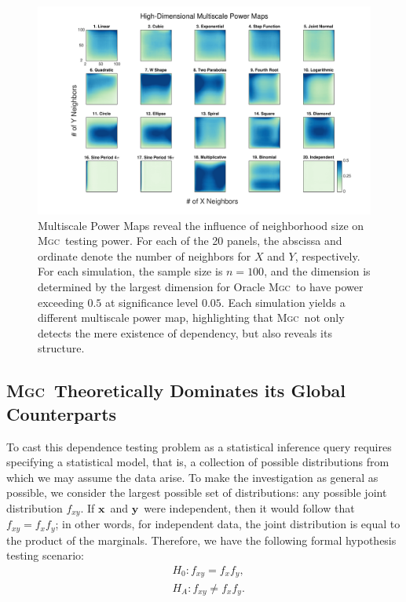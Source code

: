 \documentclass[11pt]{article}
\providecommand{\sct}[1]{{\normalfont\textsc{#1}}}
\providecommand{\mb}[1]{\boldsymbol{#1}}
\newcommand{\Mgc}{\sct{Mgc}}
\newcommand{\mbx}{\ensuremath{\mb{x}}}
\newcommand{\mby}{\ensuremath{\mb{y}}}
\begin{document}
\begin{figure}[htbp]
\includegraphics[width=1.0\textwidth]{Figures/FigHDHeat}
\caption{Multiscale Power Maps reveal the influence of neighborhood size on \Mgc~testing power.
For each of the 20 panels, the abscissa and ordinate denote the number of neighbors for $X$ and  $Y$, respectively. For each simulation, the sample size is $n=100$,  and the dimension is determined by the largest dimension for Oracle \Mgc~to have power exceeding $0.5$ at significance level  $0.05$. Each simulation yields a different multiscale power map, highlighting that \Mgc~not only detects the mere existence of dependency, but also reveals its  structure.}
\label{f:powermaps}
\end{figure}


\subsection*{\Mgc~Theoretically Dominates its Global Counterparts}
\label{s:theory}

To cast this dependence testing problem as a statistical inference query requires specifying a statistical model, that is, a collection of possible distributions from which we may assume the data arise.  To make the investigation as general as possible, we consider the largest possible set of distributions: any possible joint distribution $f_{xy}$. If \mbx~and \mby~were independent, then it would follow that $f_{xy}=f_x f_y$; in other words, for independent data, the joint distribution is equal to the product of the marginals.  Therefore, we have the following formal hypothesis testing scenario:
\begin{align*}
& H_{0}: f_{xy}=f_{x}f_{y},\\
& H_{A}: f_{xy} \neq f_{x}f_{y}.
\end{align*}
\end{document}
